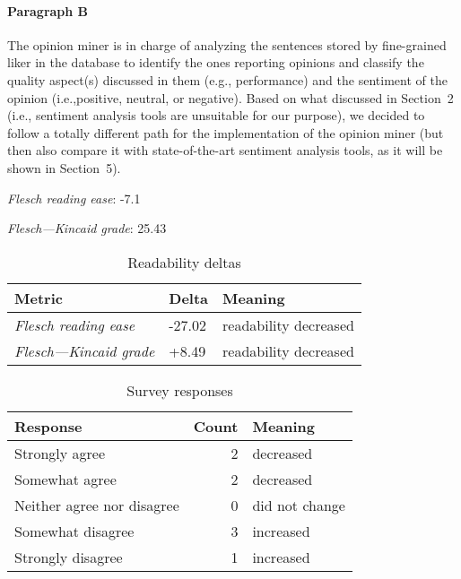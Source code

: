 \paragraph{Paragraph B}
The opinion miner is in charge of analyzing the sentences stored by fine-grained liker in the database to identify the ones reporting opinions and classify the quality aspect(s) discussed in them (e.g., performance) and the sentiment of the opinion (i.e.,positive, neutral, or negative). Based on what discussed in Section 2 (i.e., sentiment analysis tools are unsuitable for our purpose), we decided to follow a totally different path for the implementation of the opinion miner (but then also compare it with state-of-the-art sentiment analysis tools, as it will be shown in Section 5).\par\medskip
\emph{Flesch reading ease}: -7.1\par
\emph{Flesch---Kincaid grade}: 25.43

\bigskip\begin{table}[!h]
\centering
\begin{tabular}{lll}
\toprule
               \textbf{Metric} & \textbf{Delta} &       \textbf{Meaning} \\
\midrule
    \emph{Flesch reading ease} &         -27.02 &  readability decreased \\
 \emph{Flesch---Kincaid grade} &          +8.49 &  readability decreased \\
\bottomrule
\end{tabular}
\caption*{Readability deltas}\end{table}

\begin{table}[!h]
\centering
\begin{tabular}{lrl}
\toprule
          \textbf{Response} &  \textbf{Count} & \textbf{Meaning} \\
\midrule
             Strongly agree &               2 &        decreased \\
             Somewhat agree &               2 &        decreased \\
 Neither agree nor disagree &               0 &   did not change \\
          Somewhat disagree &               3 &        increased \\
          Strongly disagree &               1 &        increased \\
\bottomrule
\end{tabular}
\caption*{Survey responses}\end{table}


